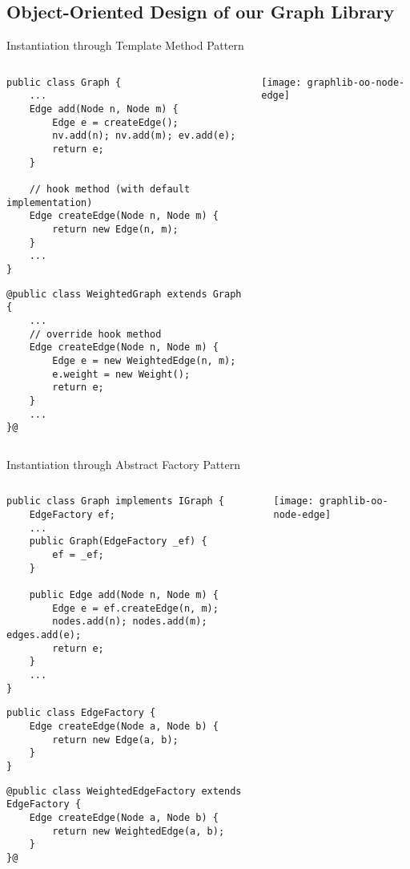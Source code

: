\subsection{Object-Oriented Design of our Graph Library}
\begin{frame}{\myframetitle}
\end{frame}

\begin{frame}[fragile]{Instantiation through Template Method Pattern}
		\begin{columns}
\begin{tiny}
\begin{lstlisting}
public class Graph {
	...
	Edge add(Node n, Node m) {
		Edge e = createEdge();
		nv.add(n); nv.add(m); ev.add(e);
		return e;
	}
	
	// hook method (with default implementation)
	Edge createEdge(Node n, Node m) {
		return new Edge(n, m);
	}
	...
}
\end{lstlisting}
\begin{lstlisting}
@public class WeightedGraph extends Graph {
	...
	// override hook method
	Edge createEdge(Node n, Node m) {
		Edge e = new WeightedEdge(n, m);
		e.weight = new Weight();
		return e;
	}
	...
}@
\end{lstlisting}
\end{tiny}	
				\texttt{[image: graphlib-oo-node-edge]}	
		\end{columns}
\end{frame}

\begin{frame}[fragile]{Instantiation through Abstract Factory Pattern}
		\begin{columns}
			\column{.45\textwidth}
\begin{tiny}
\begin{lstlisting}
public class Graph implements IGraph {
	EdgeFactory ef;
	...
	public Graph(EdgeFactory _ef) {
		ef = _ef;
	}
	
	public Edge add(Node n, Node m) {
		Edge e = ef.createEdge(n, m);
		nodes.add(n); nodes.add(m); edges.add(e);
		return e;
	}
	...
}
\end{lstlisting}
\begin{lstlisting}
public class EdgeFactory {
	Edge createEdge(Node a, Node b) {
		return new Edge(a, b);
	}
}
\end{lstlisting}
\begin{lstlisting}
@public class WeightedEdgeFactory extends EdgeFactory {
	Edge createEdge(Node a, Node b) {
		return new WeightedEdge(a, b);
	}
}@
\end{lstlisting}
\end{tiny}	
			\column{.45\textwidth}
				\texttt{[image: graphlib-oo-node-edge]}	
		\end{columns}
\end{frame}

